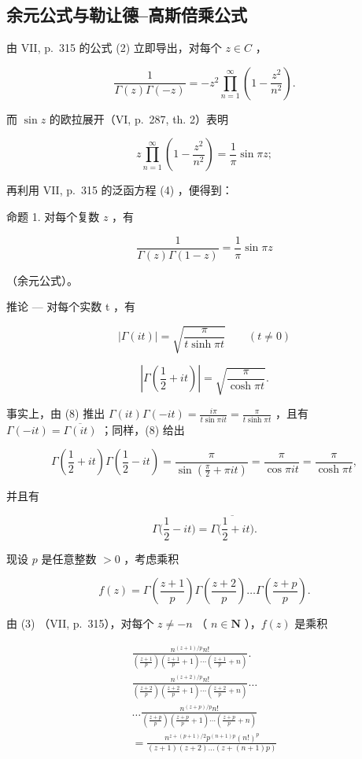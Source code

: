 \subsection{余元公式与勒让德–高斯倍乘公式}

由 VII, p.~315 的公式 (2) 立即导出，对每个 \(z \in C\) ，

\[
\frac {1}{\Gamma (z) \Gamma (- z)} = - z ^ {2} \prod_ {n = 1} ^ {\infty} \left(1 - \frac {z ^ {2}}{n ^ {2}}\right).
\]

而 \(\sin z\) 的欧拉展开（VI, p.~287, th. 2）表明

\[
z \prod_ {n = 1} ^ {\infty} \left(1 - \frac {z ^ {2}}{n ^ {2}}\right) = \frac {1}{\pi} \sin \pi z;
\]

再利用 VII, p.~315 的泛函方程 (4) ，便得到：

命题 1. 对每个复数 \(z\) ，有

\[
\frac {1}{\Gamma (z) \Gamma (1 - z)} = \frac {1}{\pi} \sin \pi z\tag{8}
\]

（余元公式）。

推论 --- 对每个实数 t ，有

\[
| \Gamma (i t) | = \sqrt {\frac {\pi}{t \sinh \pi t}} \qquad (t \neq 0)\tag{9}
\]

\[
\left| \Gamma (\frac {1}{2} + i t) \right| = \sqrt {\frac {\pi}{\cosh \pi t}}.\tag{10}
\]

事实上，由 (8) 推出 \(\Gamma(it)\Gamma(-it) = \frac{i\pi}{t\sin\pi it} = \frac{\pi}{t\sinh\pi t}\) ，且有 \(\Gamma(-it) = \overline{\Gamma(it)}\) ；同样，(8) 给出

\[
\Gamma \left(\frac {1}{2} + i t\right) \Gamma \left(\frac {1}{2} - i t\right) = \frac {\pi}{\sin \left(\frac {\pi}{2} + \pi i t\right)} = \frac {\pi}{\cos \pi i t} = \frac {\pi}{\cosh \pi t},
\]

并且有

\[
\Gamma \bigl (\frac {1}{2} - i t \bigr) = \overline {{\Gamma \bigl (\frac {1}{2} + i t \bigr)}}.
\]

现设 \(p\) 是任意整数 \(> 0\) ，考虑乘积

\[
f (z) = \Gamma \left(\frac {z + 1}{p}\right) \Gamma \left(\frac {z + 2}{p}\right) \dots \Gamma \left(\frac {z + p}{p}\right).
\]

由 (3) （VII, p.~315），对每个 \(z \neq -n\) （ \(n \in \mathbf{N}\) ），\(f(z)\) 是乘积

\[
\begin{array}{c} \frac {n ^ {(z + 1) / p} n !}{\left(\frac {z + 1}{p}\right) \left(\frac {z + 1}{p} + 1\right) \cdots \left(\frac {z + 1}{p} + n\right)}. \\ \frac {n ^ {(z + 2) / p} n !}{\left(\frac {z + 2}{p}\right) \left(\frac {z + 2}{p} + 1\right) \cdots \left(\frac {z + 2}{p} + n\right)} \dots \\ \dots \frac {n ^ {(z + p) / p} n !}{\left(\frac {z + p}{p}\right) \left(\frac {z + p}{p} + 1\right) \cdots \left(\frac {z + p}{p} + n\right)} \\ = \frac {n ^ {z + (p + 1) / 2} p ^ {(n + 1) p} (n !) ^ {p}}{(z + 1) (z + 2) \ldots (z + (n + 1) p)} \end{array}
\]

